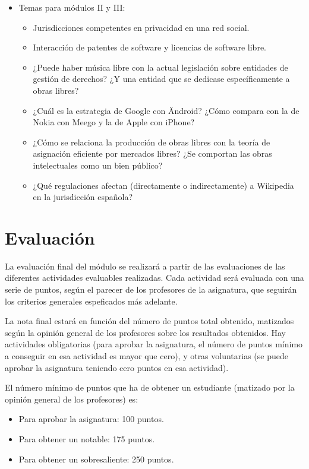 \documentclass[a4paper,12pt]{article}
\begin{document}
\begin{itemize}
\begin{itemize}
  \end{itemize}
\item Temas para módulos II y III:
  \begin{itemize}
  \item Jurisdicciones competentes en privacidad en una red social.
  \item Interacción de patentes de software y licencias de software libre.
  \item ¿Puede haber música libre con la actual legislación sobre entidades de gestión de derechos? ¿Y una entidad que se dedicase específicamente a obras libres?
  \item ¿Cuál es la estrategia de Google con Ändroid? ¿Cómo compara con la de Nokia con Meego y la de Apple con iPhone?
  \item ¿Cómo se relaciona la producción de obras libres con la teoría de asignación eficiente por mercados libres? ¿Se comportan las obras intelectuales como un bien público?
  \item ¿Qué regulaciones afectan (directamente o indirectamente) a Wikipedia en la jurisdicción española?
  \end{itemize}
\end{itemize}

\section{Evaluación}

La evaluación final del módulo se realizará a partir de las evaluaciones de las diferentes actividades evaluables realizadas. Cada actividad será evaluada con una serie de puntos, según el parecer de los profesores de la asignatura, que seguirán los criterios generales espeficados más adelante.

La nota final estará en función del número de puntos total obtenido, matizados según la opinión general de los profesores sobre los resultados obtenidos. Hay actividades obligatorias (para aprobar la asignatura, el número de puntos mínimo a conseguir en esa actividad es mayor que cero), y otras voluntarias (se puede aprobar la asignatura teniendo cero puntos en esa actividad).

El número mínimo de puntos que ha de obtener un estudiante (matizado por la opinión general de los profesores) es:

\begin{itemize}
\item Para aprobar la asignatura: 100 puntos.
\item Para obtener un notable: 175 puntos.
\item Para obtener un sobresaliente: 250 puntos.
\end{itemize}
\end{document}
